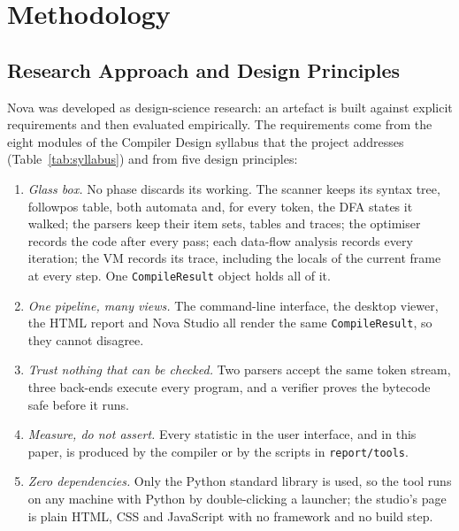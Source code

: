 \documentclass[conference]{IEEEtran}
\newcommand{\code}[1]{\texttt{#1}}
\begin{document}
\section{Methodology}
\label{sec:method}

\subsection{Research Approach and Design Principles}
Nova was developed as design-science research: an artefact is built against explicit requirements and then evaluated empirically. The requirements come from the eight modules of the Compiler Design syllabus that the project addresses (Table~\ref{tab:syllabus}) and from five design principles:
\begin{enumerate}
\item \emph{Glass box.} No phase discards its working. The scanner keeps its syntax tree, followpos table, both automata and, for every token, the DFA states it walked; the parsers keep their item sets, tables and traces; the optimiser records the code after every pass; each data-flow analysis records every iteration; the VM records its trace, including the locals of the current frame at every step. One \code{CompileResult} object holds all of it.
\item \emph{One pipeline, many views.} The command-line interface, the desktop viewer, the HTML report and Nova Studio all render the same \code{CompileResult}, so they cannot disagree.
\item \emph{Trust nothing that can be checked.} Two parsers accept the same token stream, three back-ends execute every program, and a verifier proves the bytecode safe before it runs.
\item \emph{Measure, do not assert.} Every statistic in the user interface, and in this paper, is produced by the compiler or by the scripts in \code{report/tools}.
\item \emph{Zero dependencies.} Only the Python standard library is used, so the tool runs on any machine with Python by double-clicking a launcher; the studio's page is plain HTML, CSS and JavaScript with no framework and no build step.
\end{enumerate}
\end{document}
